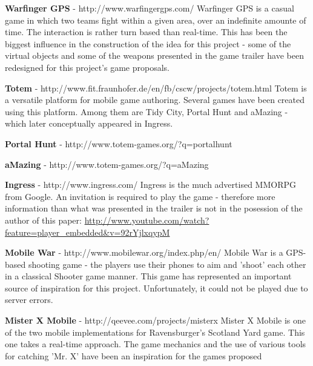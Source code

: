 \documentclass{article}
\begin{document}
\textbf{Warfinger GPS} - http://www.warfingergps.com/ \newline
Warfinger GPS is a casual game in which two teams fight within a given area,
over an indefinite amounte of time. The interaction is rather turn based than
real-time. This has been the biggest influence in the construction of the idea
for this project - some of the virtual objects and some of the weapons presented
in the game trailer have been redesigned for this project's game
proposals.\newline

\textbf{Totem} - http://www.fit.fraunhofer.de/en/fb/cscw/projects/totem.html
\newline
Totem is a versatile platform for mobile game authoring. Several games have been
created using this platform. Among them are Tidy City, Portal Hunt and aMazing -
which later conceptually appeared in Ingress.\newline

\textbf{Portal Hunt} - http://www.totem-games.org/?q=portalhunt \newline

\textbf{aMazing} - http://www.totem-games.org/?q=aMazing \newline

\textbf{Ingress} - http://www.ingress.com/ \newline
Ingress is the much advertised MMORPG from Google. An invitation is required to
play the game - therefore more information than what was presented in the
trailer is not in the posession of the author of this paper:\newline
\url{http://www.youtube.com/watch?feature=player_embedded&v=92rYjlxqypM}\newline

\textbf{Mobile War} - http://www.mobilewar.org/index.php/en/ \newline
Mobile War is a GPS-based shooting game - the players use their phones to aim
and 'shoot' each other in a classical Shooter game manner. This game has
represented an important source of inspiration for this project.
Unfortunately, it could not be played due to server errors.\newline

\textbf{Mister X Mobile} - http://qeevee.com/projects/misterx \newline
Mister X Mobile is one of the two mobile implementations for Ravensburger's
Scotland Yard game. This one takes a real-time approach. The game mechanics and
the use of various tools for catching 'Mr. X' have been an inspiration for the
games proposed\newline
\end{document}
